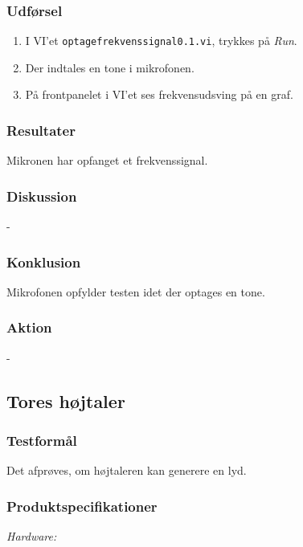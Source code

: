 		\subsubsection{Udførsel}
			\begin{enumerate}
				\item I VI'et \texttt{optagefrekvenssignal0.1.vi}, trykkes på \textit{Run}.  
				\item Der indtales en tone i mikrofonen. 
				\item På frontpanelet i VI'et ses frekvensudsving på en graf.  
			\end{enumerate}
		
		\subsubsection{Resultater}
		Mikronen har opfanget et frekvenssignal. 
		\subsubsection{Diskussion} 
		-
		\subsubsection{Konklusion}
		Mikrofonen opfylder testen idet der optages en tone. 
		\subsubsection{Aktion}
		- 
	
	\subsection{Tores højtaler}
		\subsubsection{Testformål}
		Det afprøves, om højtaleren kan generere en lyd.
		\subsubsection{Produktspecifikationer}
	
	
		\textit{Hardware:}\\
		\tores\\
		\\
		\kabelsko\\
		\pins\\
		\arduino\\
		\PC\\
		\usbkabel\\
	
